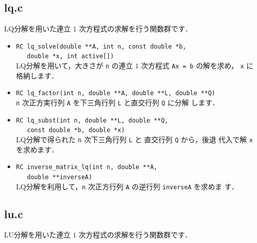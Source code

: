 \subsection{lq.c}

LQ分解を用いた連立 $1$ 次方程式の求解を行う関数群です．

\begin{itemize}
\item \verb|RC lq_solve(double **A, int n, const double *b, | \\
	\verb|   double *x, int active[])| \ \\
LQ分解を用いて，大きさが \verb|n| の連立 $1$ 次方程式 \verb|Ax = b| の解を求め，
\verb|x| に格納します．

\item \verb|RC lq_factor(int n, double **A, double **L, double **Q)| \ \\
\verb|n| 次正方実行列 \verb|A| を下三角行列 \verb|L| と直交行列 \verb|Q| に分解
します．

\item \verb|RC lq_subst(int n, double **L, double **Q, | \\
	\verb|   const double *b, double *x)| \ \\
LQ分解で得られた \verb|n| 次下三角行列 \verb|L| と 直交行列 \verb|Q| から，後退
代入で解 \verb|x| を求めます．

\item \verb|RC inverse_matrix_lq(int n, double **A, | \\
	\verb|   double **inverseA)| \ \\
LQ分解を利用して，\verb|n| 次正方行列 \verb|A| の逆行列 \verb|inverseA| を求めま
す．
\end{itemize}


\subsection{lu.c}

LU分解を用いた連立 $1$ 次方程式の求解を行う関数群です．

